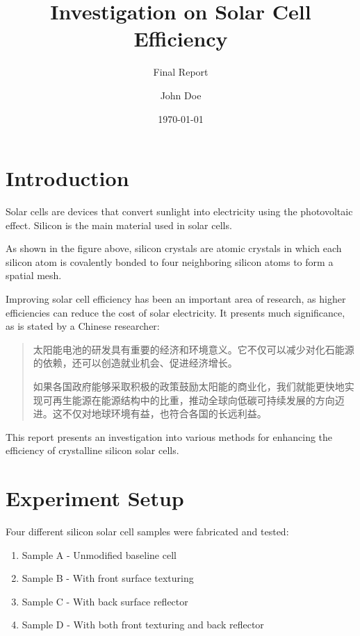 \documentclass[zh-cn]{report}
\title{Investigation on Solar Cell Efficiency}
\subtitle{Final Report}
\author{John Doe}
\date{\today}
\begin{document}
\maketitle

\section{Introduction}
Solar cells are devices that convert sunlight into electricity using the photovoltaic effect. Silicon is the main material used in solar cells. 
\begin{center}
\end{center}
As shown in the figure above, silicon crystals are atomic crystals in which each silicon atom is covalently bonded to four neighboring silicon atoms to form a spatial mesh. 

Improving solar cell efficiency has been an important area of research, as higher efficiencies can reduce the cost of solar electricity. It presents much significance, as is stated by a Chinese researcher: 

\begin{quote}
    太阳能电池的研发具有重要的经济和环境意义。它不仅可以减少对化石能源的依赖，还可以创造就业机会、促进经济增长。

    如果各国政府能够采取积极的政策鼓励太阳能的商业化，我们就能更快地实现可再生能源在能源结构中的比重，推动全球向低碳可持续发展的方向迈进。这不仅对地球环境有益，也符合各国的长远利益。
\end{quote}

This report presents an investigation into various methods for enhancing the efficiency of crystalline silicon solar cells. 

\section{Experiment Setup}
Four different silicon solar cell samples were fabricated and tested:

\begin{enumerate}
    \item Sample A - Unmodified baseline cell
    \item Sample B - With front surface texturing
    \item Sample C - With back surface reflector
    \item Sample D - With both front texturing and back reflector
\end{enumerate}
\end{document}

